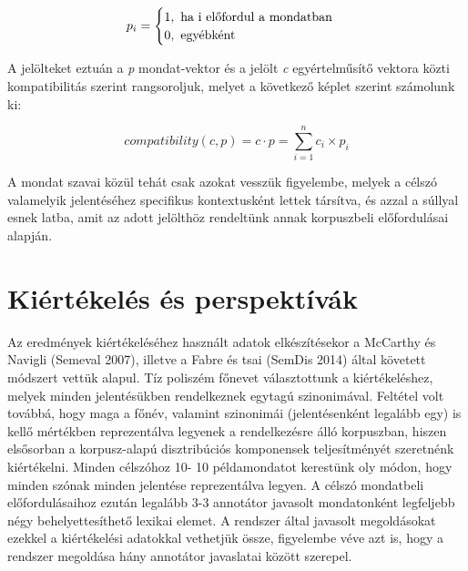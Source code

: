 \documentclass{llncs}
\begin{document}
\[
   p_i = 
\begin{cases}
    1, ~ \text{ha i el\H{o}fordul a mondatban} \\
    0,  ~ \text{egy\'{e}bk\'{e}nt}
\end{cases}
\]

A jel\"{o}lteket eztu\'{a}n a \emph{p} mondat-vektor \'{e}s a jel\"{o}lt \emph{c} egy\'{e}rtelm\H{u}s\'{i}t\H{o} vektora k\"{o}zti kompatibilit\'{a}s szerint rangsoroljuk, melyet a k\"{o}vetkez\H{o} k\'{e}plet szerint sz\'{a}molunk ki:


\begin{equation}
compatibility (c,p) = c \cdot p = \sum_{i=1}^{n} c_i \times p_i
\end{equation}

A mondat szavai k\"{o}z\"{u}l teh\'{a}t csak azokat vessz\"{u}k figyelembe, melyek a c\'{e}lsz\'{o} valamelyik jelent\'{e}s\'{e}hez specifikus kontextusk\'{e}nt lettek t\'{a}rs\'{i}tva, \'{e}s azzal a s\'{u}llyal esnek latba, amit az adott jel\"{o}lth\"{o}z rendelt\"{u}nk annak korpuszbeli el\H{o}fordul\'{a}sai alapj\'{a}n.



\section{Ki\'{e}rt\'{e}kel\'{e}s \'{e}s perspekt\'{i}v\'{a}k}

Az eredm\'{e}nyek ki\'{e}rt\'{e}kel\'{e}s\'{e}hez haszn\'{a}lt adatok elk\'{e}sz\'{i}t\'{e}sekor a McCarthy \'{e}s Navigli (Semeval 2007), illetve a Fabre \'{e}s tsai (SemDis 2014) \'{a}ltal k\"{o}vetett m\'{o}dszert vett\"{u}k alapul. T\'{i}z polisz\'{e}m f\H{o}nevet v\'{a}lasztottunk a ki\'{e}rt\'{e}kel\'{e}shez, melyek minden jelent\'{e}s\"{u}kben rendelkeznek egytag\'{u} szinonim\'{a}val. Felt\'{e}tel volt tov\'{a}bb\'{a}, hogy maga a f\H{o}n\'{e}v, valamint szinonim\'{a}i (jelent\'{e}senk\'{e}nt legal\'{a}bb egy) is kell\H{o} m\'{e}rt\'{e}kben reprezent\'{a}lva legyenek a rendelkez\'{e}sre \'{a}ll\'{o} korpuszban, hiszen els\H{o}sorban a korpusz-alap\'{u} disztrib\'{u}ci\'{o}s komponensek teljes\'{i}tm\'{e}ny\'{e}t szeretn\'{e}nk ki\'{e}rt\'{e}kelni. Minden c\'{e}lsz\'{o}hoz 10- 10 p\'{e}ldamondatot kerest\"{u}nk oly m\'{o}don, hogy minden sz\'{o}nak minden jelent\'{e}se reprezent\'{a}lva legyen. A c\'{e}lsz\'{o} mondatbeli el\H	{o}fordul\'{a}saihoz ezut\'{a}n legal\'{a}bb 3-3 annot\'{a}tor javasolt mondatonk\'{e}nt legfeljebb n\'{e}gy behelyettes\'{i}thet\H{o} lexikai elemet. A rendszer \'{a}ltal javasolt megold\'{a}sokat ezekkel a ki\'{e}rt\'{e}kel\'{e}si adatokkal vethetj\"{u}k \"{o}ssze, figyelembe v\'{e}ve azt is, hogy a rendszer megold\'{a}sa h\'{a}ny annot\'{a}tor javaslatai k\"{o}z\"{o}tt szerepel. \\
\end{document}
